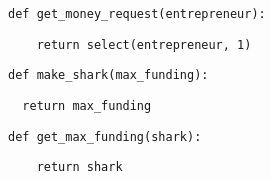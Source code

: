 \begin{lstlisting}
def get_money_request(entrepreneur):
\end{lstlisting}
\begin{solution}[0.5in]
\begin{lstlisting}
    return select(entrepreneur, 1)
\end{lstlisting}
\end{solution}

\begin{lstlisting}
def make_shark(max_funding):
\end{lstlisting}
\begin{solution}[0.5in]
\begin{lstlisting}
  return max_funding
\end{lstlisting}
\end{solution}

\begin{lstlisting}
def get_max_funding(shark):
\end{lstlisting}
\begin{solution}[0.1in]
\begin{lstlisting}
    return shark
\end{lstlisting}
\end{solution}
